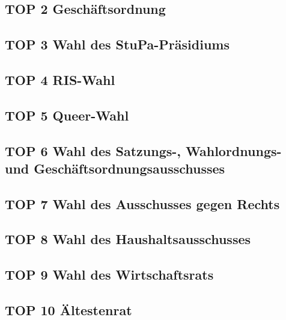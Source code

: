 \documentclass[ngerman,headheight=70pt]{scrartcl}
\begin{document}
    \subsection*{TOP 2 Geschäftsordnung}

    \subsection*{TOP 3 Wahl des StuPa-Präsidiums}

    \subsection*{TOP 4 RIS-Wahl}

    \subsection*{TOP 5 Queer-Wahl}

    \subsection*{TOP 6 Wahl des Satzungs-, Wahlordnungs- und Geschäftsordnungsausschusses}

    \subsection*{TOP 7 Wahl des Ausschusses gegen Rechts}

    \subsection*{TOP 8 Wahl des Haushaltsausschusses}

    \subsection*{TOP 9 Wahl des Wirtschaftsrats}

    \subsection*{TOP 10 Ältestenrat}
\end{document}
